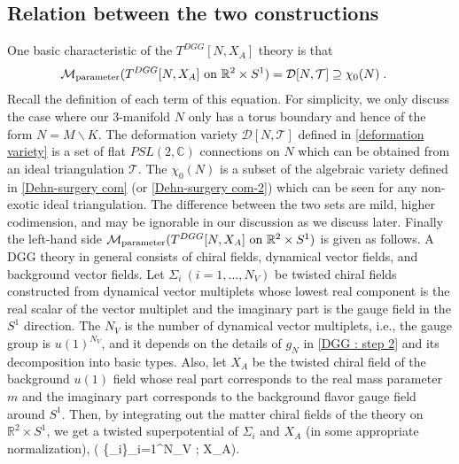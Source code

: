 \documentclass[a4paper,11pt]{article}
\def\cT{\mathcal{T}}
\def\cD{\mathcal{D}}
\def\BR{{\mathbb R}}
\def\beq#1\eeq{\begin{align}#1\end{align}}
\def\alert#1{{\color{red}[#1]}}
\begin{document}
\subsection{Relation between the two constructions}\label{sec:rel}
One basic characteristic of the $T^{DGG}[N,X_A]$ theory is that \cite{Dimofte:2011ju}
%
\begin{align}
\begin{split}
&\mathcal{M}_{\rm parameter}(\textrm{$T^{DGG}[N,X_A]$ on $\mathbb{R}^2\times S^1$}) =\cD[N,\cT] \supseteq  \chi_0(N) \;.
\end{split} \label{eq:moduliID}
\end{align}
%
Recall the definition of each term of this equation. For simplicity, we only discuss the case where our 3-manifold $N$
only has a torus boundary and hence of the form $N=M \backslash K$.
The deformation variety $\cD[N,\cT] $ defined in \eqref{deformation variety} is a set of flat $PSL(2,\mathbb{C})$ connections on $N$ 
which can be obtained from an ideal triangulation $\cT$. The $\chi_0(N)$  is  a subset of the algebraic variety  defined in   \eqref{Dehn-surgery com} (or \eqref{Dehn-surgery com-2})  which can be seen for any non-exotic ideal triangulation. 
The difference between the two sets are mild, higher codimension, and may be ignorable in our discussion as we discuss later.
Finally the left-hand side $\mathcal{M}_{\rm parameter}(\textrm{$T^{DGG}[N,X_A]$ on $\mathbb{R}^2\times S^1$}) $ is given as follows.
A DGG theory in general consists of chiral fields, dynamical vector fields, and background vector fields.
Let $\Sigma_i~(i=1,\ldots, N_V)$ be twisted chiral fields constructed from dynamical vector multiplets 
whose lowest real component is the real scalar of the vector multiplet
and the imaginary part is the gauge field in the $S^1$ direction. 
The $N_V$ is the number of dynamical vector multiplets, i.e., the gauge group is $u(1)^{N_V}$, and it depends on the details of $g_N$ in \eqref{DGG : step 2} and its decomposition into basic types.
Also, let $X_A$ be the twisted chiral field of the background $u(1) $ field whose real part corresponds to the real mass parameter $m$ and the imaginary part corresponds
to the background flavor gauge field around $S^1$. 
Then, by integrating out the matter chiral fields of the theory on $\BR^2 \times S^1$, we
get a twisted superpotential of $\Sigma_i$ and $X_A$ (in some appropriate normalization),
\beq
\widetilde{\mathcal{W}}( \{\Sigma_i\}_{i=1}^{N_V} ; X_A). 
\end{document}

